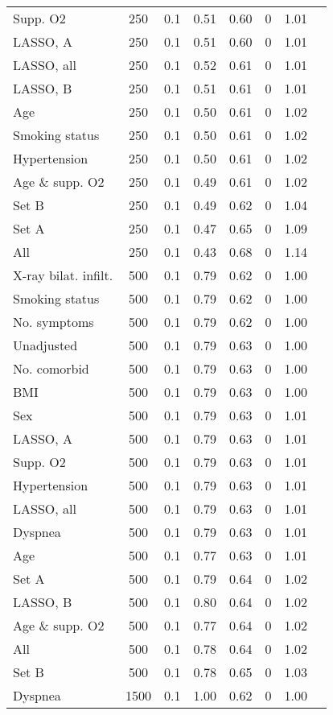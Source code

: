 \documentclass{article}
\begin{document}
{\begin{longtable}{lccccccc}
Supp. O2 & 250 & 0.1 & 0.51 & 0.60 & 0 & 1.01\\
LASSO, A & 250 & 0.1 & 0.51 & 0.60 & 0 & 1.01\\
LASSO, all & 250 & 0.1 & 0.52 & 0.61 & 0 & 1.01\\
LASSO, B & 250 & 0.1 & 0.51 & 0.61 & 0 & 1.01\\
Age & 250 & 0.1 & 0.50 & 0.61 & 0 & 1.02\\
Smoking status & 250 & 0.1 & 0.50 & 0.61 & 0 & 1.02\\
Hypertension & 250 & 0.1 & 0.50 & 0.61 & 0 & 1.02\\
Age \& supp. O2 & 250 & 0.1 & 0.49 & 0.61 & 0 & 1.02\\
Set B & 250 & 0.1 & 0.49 & 0.62 & 0 & 1.04\\
Set A & 250 & 0.1 & 0.47 & 0.65 & 0 & 1.09\\
All & 250 & 0.1 & 0.43 & 0.68 & 0 & 1.14\\ \midrule
X-ray bilat. infilt. & 500 & 0.1 & 0.79 & 0.62 & 0 & 1.00\\
Smoking status & 500 & 0.1 & 0.79 & 0.62 & 0 & 1.00\\
No. symptoms & 500 & 0.1 & 0.79 & 0.62 & 0 & 1.00\\
Unadjusted & 500 & 0.1 & 0.79 & 0.63 & 0 & 1.00\\
No. comorbid & 500 & 0.1 & 0.79 & 0.63 & 0 & 1.00\\
BMI & 500 & 0.1 & 0.79 & 0.63 & 0 & 1.00\\
Sex & 500 & 0.1 & 0.79 & 0.63 & 0 & 1.01\\
LASSO, A & 500 & 0.1 & 0.79 & 0.63 & 0 & 1.01\\
Supp. O2 & 500 & 0.1 & 0.79 & 0.63 & 0 & 1.01\\
Hypertension & 500 & 0.1 & 0.79 & 0.63 & 0 & 1.01\\
LASSO, all & 500 & 0.1 & 0.79 & 0.63 & 0 & 1.01\\
Dyspnea & 500 & 0.1 & 0.79 & 0.63 & 0 & 1.01\\
Age & 500 & 0.1 & 0.77 & 0.63 & 0 & 1.01\\
Set A & 500 & 0.1 & 0.79 & 0.64 & 0 & 1.02\\
LASSO, B & 500 & 0.1 & 0.80 & 0.64 & 0 & 1.02\\
Age \& supp. O2 & 500 & 0.1 & 0.77 & 0.64 & 0 & 1.02\\
All & 500 & 0.1 & 0.78 & 0.64 & 0 & 1.02\\
Set B & 500 & 0.1 & 0.78 & 0.65 & 0 & 1.03\\ \midrule
Dyspnea & 1500 & 0.1 & 1.00 & 0.62 & 0 & 1.00\\

\end{longtable}}
\end{document}
